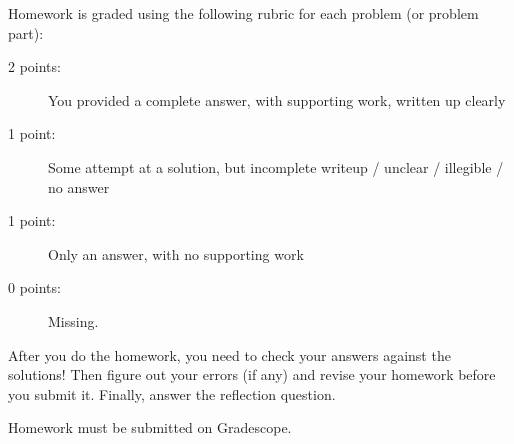 \documentclass[11pt, oneside]{article}   	%
\begin{document}
Homework is graded using the following rubric for each problem (or problem part):

\begin{description}
\item[2 points:] You provided a complete answer, with supporting work, written up clearly
\item[1 point:] Some attempt at a solution, but incomplete writeup / unclear / illegible / no answer
\item[1 point:] Only an answer, with no supporting work 
\item[0 points:] Missing.
\end{description}

After you do the homework, you need to check your answers against the solutions! Then figure out your errors (if any) and revise your homework before you submit it. Finally, answer the reflection question.

Homework must be submitted on Gradescope.
\end{document}
